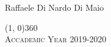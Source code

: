 \documentclass[a4paper, 8pt, twoside, openright]{book}
\newenvironment{abstract}{\cleardoublepage \null \vfill \begin{center}\bfseries\abstractname \end{center}}{\vfill\null}
\begin{document}
\begin{titlepage}
\vspace{12cm}
\begin{center}
Raffaele Di Nardo Di Maio
\end{center}

\vfill
\begin{center}
\hspace{-0.2cm}
\line(1, 0){360}\\
\textsc{Accademic Year 2019-2020}
\end{center}
\end{titlepage}


\cleardoublepage %
\thispagestyle{empty} %

%
\begingroup %
  \makeatletter
  \let\ps@plain\ps@empty
  \makeatother
  \tableofcontents  
  \clearpage
\endgroup

\mainmatter



\end{document}
